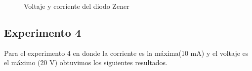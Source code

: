 \documentclass{mylib/reporteConCalif}
\begin{document}
\begin{figure}[H]%
    \centering
    \qquad
    \caption{Voltaje y corriente del diodo Zener}%
    \label{fig:example}%
\end{figure}

\subsection{Experimento 4}

Para el experimento 4 en donde la corriente es la máxima(10 mA) y el voltaje es el máximo (20 V) obtuvimos los siguientes resultados.
\end{document}

